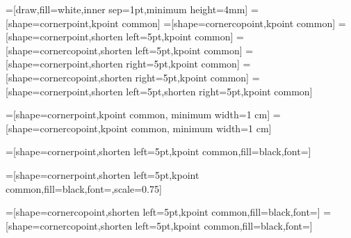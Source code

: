 
\makeatother




=[draw,fill=white,inner sep=1pt,minimum height=4mm]
=[shape=cornerpoint,kpoint common]
=[shape=cornercopoint,kpoint common]
=[shape=cornerpoint,shorten left=5pt,kpoint common]
=[shape=cornercopoint,shorten left=5pt,kpoint common]
=[shape=cornerpoint,shorten right=5pt,kpoint common]
=[shape=cornercopoint,shorten right=5pt,kpoint common]
=[shape=cornerpoint,shorten left=5pt,shorten right=5pt,kpoint common]

=[shape=cornerpoint,kpoint common, minimum width=1 cm]
=[shape=cornercopoint,kpoint common, minimum width=1 cm]

=[shape=cornerpoint,shorten left=5pt,kpoint common,fill=black,font=\color{white}]

=[shape=cornerpoint,shorten left=5pt,kpoint common,fill=black,font=\color{white},scale=0.75]

=[shape=cornercopoint,shorten left=5pt,kpoint common,fill=black,font=\color{white}]
=[shape=cornercopoint,shorten left=5pt,kpoint common,fill=black,font=\color{white}]

